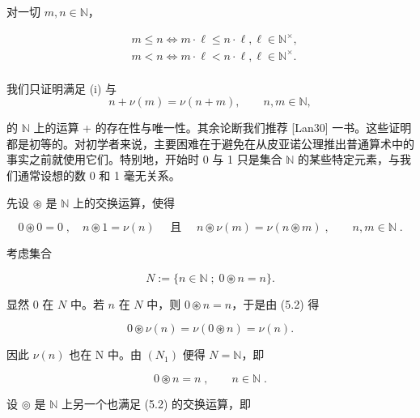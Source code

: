 \begin{theorem}
\begin{subitems}
\item

对一切 $ m, n \in \mathbb{N} $，

\begin{equation*}
\begin{aligned}
&m\leq n\iff m\cdot\ell\leq n\cdot\ell,\ell\in\mathbb{N}^{\times},\\&m<n\iff m\cdot\ell<n\cdot\ell,\ell\in\mathbb{N}^{\times}.\\
\end{aligned}
\end{equation*}

\proofhead
我们只证明满足 (i) 与
\begin{equation}
n+\nu(m)=\nu(n+m),\qquad n,m\in\mathbb{N},
\end{equation}

的 $ \mathbb{N} $ 上的运算 + 的存在性与唯一性。其余论断我们推荐 [Lan30] 一书。这些证明都是初等的。对初学者来说，主要困难在于避免在从皮亚诺公理推出普通算术中的事实之前就使用它们。特别地，开始时 0 与 1 只是集合 $ \mathbb{N} $ 的某些特定元素，与我们通常设想的数 0 和 1 毫无关系。

\end{subitems}

\begin{items}
\item

先设 $ \circledast $ 是 $ \mathbb{N} $ 上的交换运算，使得

\begin{equation}
0\circledast0=0\;,\quad n\circledast1=\nu(n)\quad\text{ 且 }\quad n\circledast\nu(m)=\nu(n\circledast m)\;,\qquad n,m\in\mathbb{N}\;.
\end{equation}

考虑集合

\begin{equation}
N:=\{n\in\mathbb{N}\;;\;0\circledast n=n\}.
\end{equation}

显然 0 在 $N$ 中。若 $n$ 在 $N$ 中，则 $0\circledast n = n$，于是由 (5.2) 得

\[
0\circledast\nu(n)=\nu(0\circledast n)=\nu(n).
\]

因此 $ \nu(n) $ 也在 N 中。由 $ (N_{1}) $ 便得 $ N = \mathbb{N} $，即

\[
0\circledast n=n\;,\qquad n\in\mathbb{N}\;.
\]
\item

设 $ \circledcirc $ 是 $ \mathbb{N} $ 上另一个也满足 (5.2) 的交换运算，即


\end{items}
\end{theorem}
